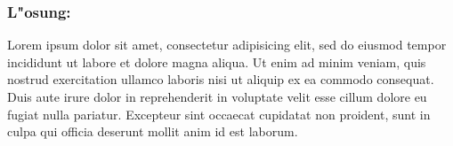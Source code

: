 \documentclass[12pt]{article}
\begin{document}
\subsubsection*{L"osung:}
Lorem ipsum dolor sit amet, consectetur adipisicing elit, sed do eiusmod tempor incididunt ut labore et dolore magna aliqua. Ut enim ad minim veniam, quis nostrud exercitation ullamco laboris nisi ut aliquip ex ea commodo consequat. Duis aute irure dolor in reprehenderit in voluptate velit esse cillum dolore eu fugiat nulla pariatur. Excepteur sint occaecat cupidatat non proident, sunt in culpa qui officia deserunt mollit anim id est laborum.
\end{document}
